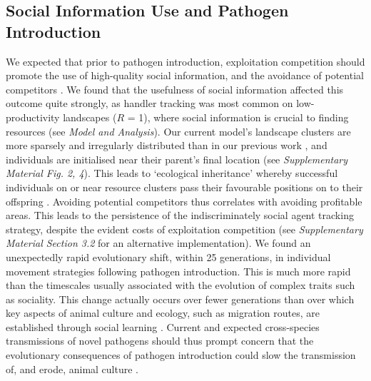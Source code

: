 \subsection*{Social Information Use and Pathogen Introduction}

We expected that prior to pathogen introduction, exploitation competition should promote the use of high-quality social information, and the avoidance of potential competitors \citep[handler tracking;][]{gupte2021a}.
We found that the usefulness of social information affected this outcome quite strongly, as handler tracking was most common on low-productivity landscapes ($R$ = 1), where social information is crucial to finding resources (see \textit{Model and Analysis}).
Our current model's landscape clusters are more sparsely and irregularly distributed than in our previous work \citep{gupte2021a}, and individuals are initialised near their parent's final location (see \textit{Supplementary Material Fig. 2, 4}).
This leads to `ecological inheritance' whereby successful individuals on or near resource clusters pass their favourable positions on to their offspring \citep{badyaev2009}.
Avoiding potential competitors thus correlates with avoiding profitable areas.
This leads to the persistence of the indiscriminately social agent tracking strategy, despite the evident costs of exploitation competition (see \textit{Supplementary Material Section 3.2} for an alternative implementation).
We found an unexpectedly rapid evolutionary shift, within 25 generations, in individual movement strategies following pathogen introduction.
This is much more rapid than the timescales usually associated with the evolution of complex traits such as sociality.
This change actually occurs over fewer generations than over which key aspects of animal culture and ecology, such as migration routes, are established through social learning \citep{jesmer2018,cantor2021}.
Current and expected cross-species transmissions of novel pathogens \citep{carlson2022a,pusceddu2021} should thus prompt concern that the evolutionary consequences of pathogen introduction could slow the transmission of, and erode, animal culture \citep{cantor2021}.

